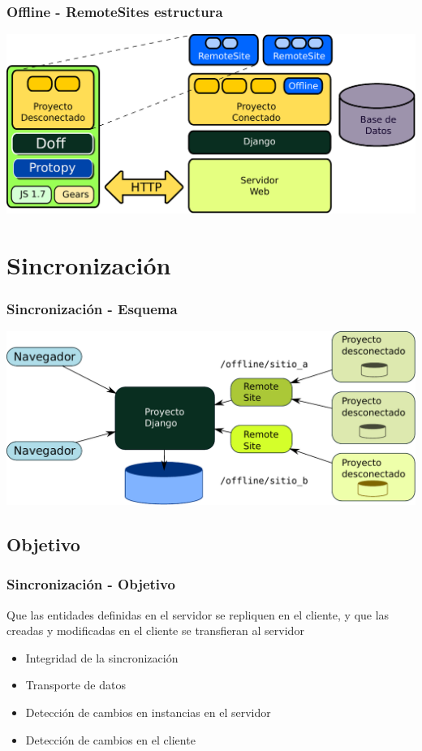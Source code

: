 \documentclass{beamer}
\begin{document}
\begin{frame}

    \frametitle{Offline - RemoteSites estructura}
    \includegraphics[scale=0.5]{remote_sites.pdf}
    
\end{frame}

\section{Sincronización}
\begin{frame}
    \frametitle{Sincronización - Esquema}
    \includegraphics[scale=0.5]{esquema_distribuido.pdf}
\end{frame}

\subsection{Objetivo}
\begin{frame}
    \frametitle{Sincronización - Objetivo}
    \par {
    	Que las entidades definidas en el servidor se repliquen en el cliente, y
    	que las creadas y modificadas en el cliente se transfieran al servidor
    }
    \begin{itemize}
        \item Integridad de la sincronización
		\item Transporte de datos
		\item Detección de cambios en instancias en el servidor
		\item Detección de cambios en el cliente
    \end{itemize}
\end{frame}
\end{document}
